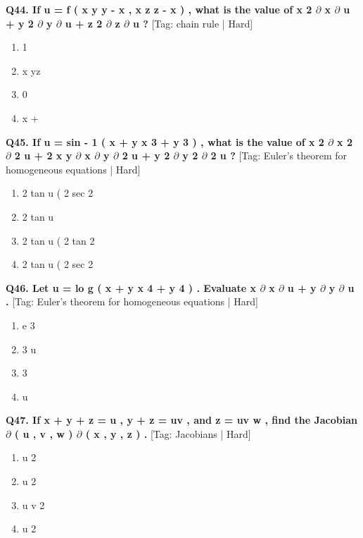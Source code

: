 \noindent\textbf{Q44. If u = f ( x y y - x , x z z - x ) , what is the value of x 2 $\partial$ x $\partial$ u + y 2 $\partial$ y $\partial$ u + z 2 $\partial$ z $\partial$ u ?} \hfill [Tag: chain rule | Hard]
\begin{enumerate}[label=(\alph*),topsep=2pt,itemsep=1pt,partopsep=0pt,parsep=0pt]
    \item {{1}}
    \item {{x yz}}
    \item {{0}}
    \item {{x +}}
\end{enumerate}
\vspace{2mm}

\noindent\textbf{Q45. If u = sin - 1 ( x + y x 3 + y 3 ) , what is the value of x 2 $\partial$ x 2 $\partial$ 2 u + 2 x y $\partial$ x $\partial$ y $\partial$ 2 u + y 2 $\partial$ y 2 $\partial$ 2 u ?} \hfill [Tag: Euler's theorem for homogeneous equations | Hard]
\begin{enumerate}[label=(\alph*),topsep=2pt,itemsep=1pt,partopsep=0pt,parsep=0pt]
    \item {{2 tan u ( 2 sec 2}}
    \item {{2 tan u}}
    \item {{2 tan u ( 2 tan 2}}
    \item {{2 tan u ( 2 sec 2}}
\end{enumerate}
\vspace{2mm}

\noindent\textbf{Q46. Let u = lo g ( x + y x 4 + y 4 ) . Evaluate x $\partial$ x $\partial$ u + y $\partial$ y $\partial$ u .} \hfill [Tag: Euler's theorem for homogeneous equations | Hard]
\begin{enumerate}[label=(\alph*),topsep=2pt,itemsep=1pt,partopsep=0pt,parsep=0pt]
    \item {{e 3}}
    \item {{3 u}}
    \item {{3}}
    \item {{u}}
\end{enumerate}
\vspace{2mm}

\noindent\textbf{Q47. If x + y + z = u , y + z = uv , and z = uv w , find the Jacobian $\partial$ ( u , v , w ) $\partial$ ( x , y , z ) .} \hfill [Tag: Jacobians | Hard]
\begin{enumerate}[label=(\alph*),topsep=2pt,itemsep=1pt,partopsep=0pt,parsep=0pt]
    \item {{u 2}}
    \item {{u 2}}
    \item {{u v 2}}
    \item {{u 2}}
\end{enumerate}
\vspace{2mm}

